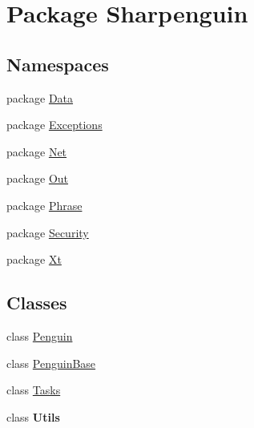 \hypertarget{namespaceSharpenguin}{\section{\-Package \-Sharpenguin}
\label{namespaceSharpenguin}
}
\subsection*{\-Namespaces}
\begin{DoxyCompactItemize}
\item 
package \hyperlink{namespaceSharpenguin_1_1Data}{\-Data}
\item 
package \hyperlink{namespaceSharpenguin_1_1Exceptions}{\-Exceptions}
\item 
package \hyperlink{namespaceSharpenguin_1_1Net}{\-Net}
\item 
package \hyperlink{namespaceSharpenguin_1_1Out}{\-Out}
\item 
package \hyperlink{namespaceSharpenguin_1_1Phrase}{\-Phrase}
\item 
package \hyperlink{namespaceSharpenguin_1_1Security}{\-Security}
\item 
package \hyperlink{namespaceSharpenguin_1_1Xt}{\-Xt}
\end{DoxyCompactItemize}
\subsection*{\-Classes}
\begin{DoxyCompactItemize}
\item 
class \hyperlink{classSharpenguin_1_1Penguin}{\-Penguin}
\item 
class \hyperlink{classSharpenguin_1_1PenguinBase}{\-Penguin\-Base}
\item 
class \hyperlink{classSharpenguin_1_1Tasks}{\-Tasks}
\item 
class {\bfseries \-Utils}
\end{DoxyCompactItemize}

